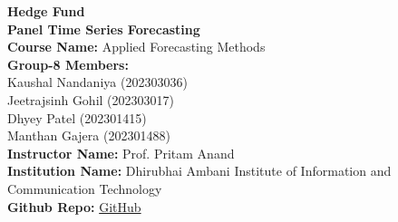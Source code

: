 \documentclass[11pt]{article}
\begin{document}
\begin{titlepage}
    \centering
    \vspace*{2cm}

    {\Huge \textbf{Hedge Fund\\
    Panel Time Series Forecasting}}\\[1cm]

    {\Large \textbf{Course Name:} Applied Forecasting Methods}\\[2cm]

    {\Large \textbf{Group-8 Members:}}\\[0.5cm]
    Kaushal Nandaniya (202303036)\\[0.2cm]
    Jeetrajsinh Gohil (202303017)\\[0.2cm]
    Dhyey Patel (202301415)\\[0.2cm]
    Manthan Gajera (202301488)\\[2cm]

    {\Large \textbf{Instructor Name:} Prof. Pritam Anand}\\[2cm]

    {\Large \textbf{Institution Name:} Dhirubhai Ambani Institute of Information and Communication Technology}\\[2cm]

    {\Large \textbf{Github Repo:} \href{https://github.com/kaushalnandaniya/HedgeFund_TimeSeriesForcasting}{GitHub}}\\[2cm]

    \vfill
\end{titlepage}
\end{document}
